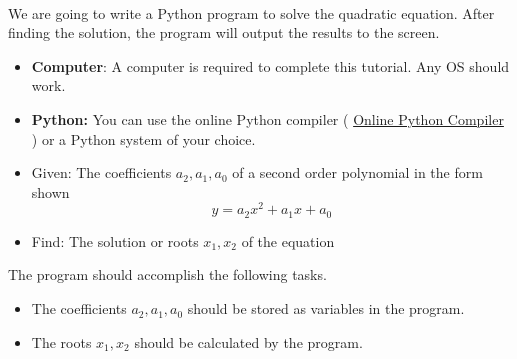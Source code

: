\documentclass[12pt]{article}
\begin{document}
\begin{description}[labelindent=1cm]
	
	\item[\textbf{\underline{Overview:}}] \hfill \vspace{3mm}\\
	We are going to write a Python program to solve the quadratic equation. After finding the solution, the program will output the results to the screen.
	
	\item[\textbf{\underline{System Requirements:}}] \hfill \vspace{0mm}

\begin{itemize}
	\item {\bf Computer}: A computer is required to complete this tutorial. Any OS should work.
	\item {\bf Python:} You can use the online Python compiler ( \href{https://www.online-python.com/online_python_compiler}{Online Python Compiler}  ) or a Python system of your choice.
\end{itemize}

	\item[\textbf{\underline{Problem Statement:}}] \hfill \vspace{0mm}
	
	\begin{itemize}

		\item Given: The coefficients $a_2,a_1,a_0$ of a second order polynomial in the form shown
		\[y=a_2x^2+a_1x+a_0 \]
		
		\item Find: The solution or roots $x_1,x_2$ of the equation
		 
	\end{itemize}

\item[\textbf{\underline{Program Minimum Requirements:}}] \hfill \vspace{0mm}

The program should accomplish the following tasks. 


\begin{itemize}

	\item The coefficients $a_2,a_1,a_0$ should be stored as variables in the program.
	
	\item The roots $x_1, x_2$ should be calculated by the program.
	

\end{itemize}
\end{description}
\end{document}
